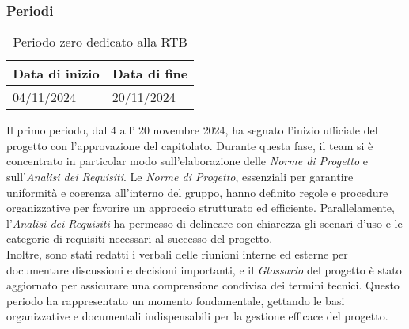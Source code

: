 \subsubsection{Periodi}
\label{sec:periodi}


\begin{table}[h!]
    \centering
    \renewcommand{\arraystretch}{1.5} %
    \begin{tabularx}{\textwidth}{|X|X|}\hline
    \rowcolor[HTML]{FFD700} 
    \textbf{Data di inizio} & \textbf{Data di fine} \\ \hline
    04/11/2024 & 20/11/2024 \\ \hline
    \end{tabularx}
    \caption{Periodo zero dedicato alla RTB}
\end{table}
Il primo periodo, dal 4 all' 20 novembre 2024, ha segnato l’inizio ufficiale del progetto con l’approvazione del capitolato. Durante questa fase, il team si è concentrato in particolar modo sull’elaborazione delle \textit{Norme di Progetto} e sull'\textit{Analisi dei Requisiti}. Le \textit{Norme di Progetto}, essenziali per garantire uniformità e coerenza all’interno del gruppo, hanno definito regole e procedure organizzative per favorire un approccio strutturato ed efficiente. Parallelamente, l’\textit{Analisi dei Requisiti} ha permesso di delineare con chiarezza gli scenari d’uso e le categorie di requisiti necessari al successo del progetto.\\
Inoltre, sono stati redatti i verbali delle riunioni interne ed esterne per documentare discussioni e decisioni importanti, e il \textit{Glossario} del progetto è stato aggiornato per assicurare una comprensione condivisa dei termini tecnici. Questo periodo ha rappresentato un momento fondamentale, gettando le basi organizzative e documentali indispensabili per la gestione efficace del progetto.

